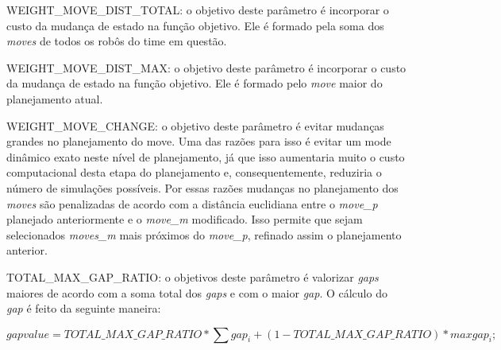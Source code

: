 WEIGHT_MOVE_DIST_TOTAL: o objetivo deste parâmetro é incorporar o custo da
mudança de estado na função objetivo. Ele é formado pela soma dos \textit{
moves} de todos os robôs do time em questão.

WEIGHT_MOVE_DIST_MAX: o objetivo deste parâmetro é incorporar o custo da
mudança de estado na função objetivo. Ele é formado pelo \textit{move}
maior do planejamento atual.

WEIGHT_MOVE_CHANGE: o objetivo deste parâmetro é evitar mudanças grandes no
planejamento do move. Uma das razões para isso é evitar um mode dinâmico
exato neste nível de planejamento, já que isso aumentaria muito o custo
computacional desta etapa do planejamento e, consequentemente, reduziria
o número de simulações possíveis. Por essas razões mudanças no planejamento
dos \textit{moves} são penalizadas de acordo com a distância euclidiana
entre o \textit{move_p} planejado anteriormente e o \textit{move_m} modificado.
Isso permite que sejam selecionados \textit{moves_m} mais próximos do
\textit{move_p}, refinado assim o planejamento anterior.


TOTAL_MAX_GAP_RATIO: o objetivos deste parâmetro é valorizar \textit{gaps} maiores
de acordo com a soma total dos \textit{gaps} e com o maior \textit{gap}.
O cálculo do \textit{gap} é feito da seguinte maneira:

\begin{equation} 
 gap value = TOTAL\_MAX\_GAP\_RATIO * \sum gap_i + (1 - TOTAL\_MAX\_GAP\_RATIO) * max{gap_i};
\end{equation} 

